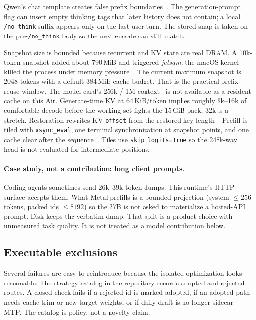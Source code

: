 Qwen’s chat template creates false prefix boundaries~\citep{qwen31826}. The generation-prompt flag can insert empty thinking tags that later history does not contain; a local \texttt{/no\_think} suffix appears only on the last user turn. The stored snap is taken on the pre-\texttt{/no\_think} body so the next encode can still match.

Snapshot size is bounded because recurrent and KV state are real DRAM. A 10k-token snapshot added about 790\,MiB and triggered \emph{jetsam}: the macOS kernel killed the process under memory pressure~\citep{applejetsam}. The current maximum snapshot is 2048 tokens with a default 384\,MiB cache budget. That is the practical prefix-reuse window. The model card’s 256k / 1M context~\citep{yarn2024} is not available as a resident cache on this Air. Generate-time KV at 64\,KiB/token implies roughly 8k--16k of comfortable decode before the working set fights the 15\,GiB pack; 32k is a stretch. Restoration rewrites KV \texttt{offset} from the restored key length~\citep{mlxlm1162}. Prefill is tiled with \texttt{async\_eval}, one terminal synchronization at snapshot points, and one cache clear after the sequence~\citep{mlxvlm945}. Tiles use \texttt{skip\_logits=True} so the 248k-way head is not evaluated for intermediate positions.

\paragraph{Case study, not a contribution: long client prompts.}
Coding agents sometimes send 26k--39k-token dumps. This runtime’s HTTP surface accepts them. What Metal prefills is a bounded projection (system $\le 256$ tokens, packed ids $\le 8192$) so the 27B is not asked to materialize a hosted-API prompt. Disk keeps the verbatim dump. That split is a product choice with unmeasured task quality. It is not treated as a model contribution below.

\subsection{Executable exclusions}

Several failures are easy to reintroduce because the isolated optimization looks reasonable. The strategy catalog in the repository records adopted and rejected routes. A closed check fails if a rejected id is marked adopted, if an adopted path needs cache trim or new target weights, or if daily draft is no longer sidecar MTP. The catalog is policy, not a novelty claim.

